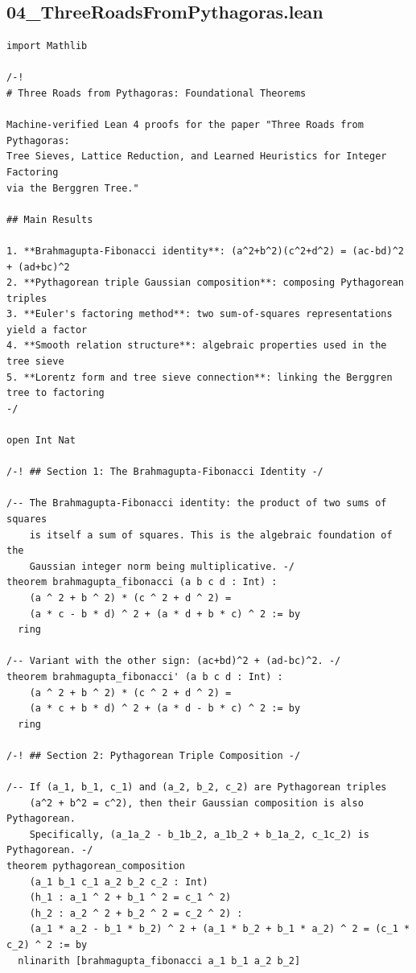\documentclass[11pt,openright,twoside]{book}
\theoremstyle{definition}
\begin{document}
\clearpage


\subsection*{04\_ThreeRoadsFromPythagoras.lean}
\label{lean:04_ThreeRoadsFromPythagoras}

\begin{lstlisting}[style=lean]
import Mathlib

/-!
# Three Roads from Pythagoras: Foundational Theorems

Machine-verified Lean 4 proofs for the paper "Three Roads from Pythagoras:
Tree Sieves, Lattice Reduction, and Learned Heuristics for Integer Factoring
via the Berggren Tree."

## Main Results

1. **Brahmagupta-Fibonacci identity**: (a^2+b^2)(c^2+d^2) = (ac-bd)^2 + (ad+bc)^2
2. **Pythagorean triple Gaussian composition**: composing Pythagorean triples
3. **Euler's factoring method**: two sum-of-squares representations yield a factor
4. **Smooth relation structure**: algebraic properties used in the tree sieve
5. **Lorentz form and tree sieve connection**: linking the Berggren tree to factoring
-/

open Int Nat

/-! ## Section 1: The Brahmagupta-Fibonacci Identity -/

/-- The Brahmagupta-Fibonacci identity: the product of two sums of squares
    is itself a sum of squares. This is the algebraic foundation of the
    Gaussian integer norm being multiplicative. -/
theorem brahmagupta_fibonacci (a b c d : Int) :
    (a ^ 2 + b ^ 2) * (c ^ 2 + d ^ 2) =
    (a * c - b * d) ^ 2 + (a * d + b * c) ^ 2 := by
  ring

/-- Variant with the other sign: (ac+bd)^2 + (ad-bc)^2. -/
theorem brahmagupta_fibonacci' (a b c d : Int) :
    (a ^ 2 + b ^ 2) * (c ^ 2 + d ^ 2) =
    (a * c + b * d) ^ 2 + (a * d - b * c) ^ 2 := by
  ring

/-! ## Section 2: Pythagorean Triple Composition -/

/-- If (a_1, b_1, c_1) and (a_2, b_2, c_2) are Pythagorean triples
    (a^2 + b^2 = c^2), then their Gaussian composition is also Pythagorean.
    Specifically, (a_1a_2 - b_1b_2, a_1b_2 + b_1a_2, c_1c_2) is Pythagorean. -/
theorem pythagorean_composition
    (a_1 b_1 c_1 a_2 b_2 c_2 : Int)
    (h_1 : a_1 ^ 2 + b_1 ^ 2 = c_1 ^ 2)
    (h_2 : a_2 ^ 2 + b_2 ^ 2 = c_2 ^ 2) :
    (a_1 * a_2 - b_1 * b_2) ^ 2 + (a_1 * b_2 + b_1 * a_2) ^ 2 = (c_1 * c_2) ^ 2 := by
  nlinarith [brahmagupta_fibonacci a_1 b_1 a_2 b_2]


\end{lstlisting}
\end{document}
